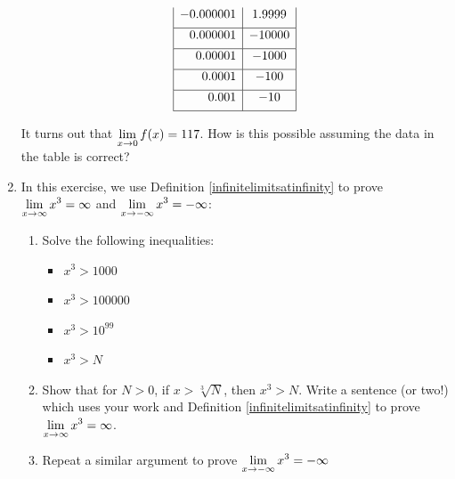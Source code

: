 \documentclass{ximera}
\begin{document}
\begin{enumerate}
\[\begin{array}{|r|c|}
-0.000001 & 1.9999 \\ [1ex]  \hline

0.000001 & -10000\\  [1ex]   \hline

0.00001 & -1000 \\ [1ex]  \hline

0.0001 & - 100 \\  [1ex] \hline

0.001 & -10 \\ [1ex]  \hline


\end{array} \]

It turns out that $\ds{\lim_{x \rightarrow 0} f(x) = 117}$.  How is this possible assuming the data in the table is correct?

\item  In this exercise, we use Definition \ref{infinitelimitsatinfinity} to prove $\ds{\lim_{x \rightarrow \infty} x^3 = \infty}$ and $\ds{\lim_{x \rightarrow -\infty} x^3 = -\infty}$:


\begin{enumerate}

\item  Solve the following inequalities:

\begin{multicols}{4}

\begin{itemize}

\item  $x^3 > 1000$

\item  $x^3 > 100000$

\item  $x^3 > 10^{99}$

\item  $x^3 > N$

\end{itemize}

\end{multicols}

\item  Show that for $N > 0$, if $x > \sqrt[3]{N}$, then $x^3 > N$.  Write a sentence (or two!) which uses your work and Definition \ref{infinitelimitsatinfinity} to prove $\ds{\lim_{x \rightarrow \infty} x^3 = \infty}$.

\item  Repeat a similar argument to prove $\ds{\lim_{x \rightarrow -\infty} x^3 = -\infty}$

\end{enumerate}
 
\end{enumerate}
\end{document}
